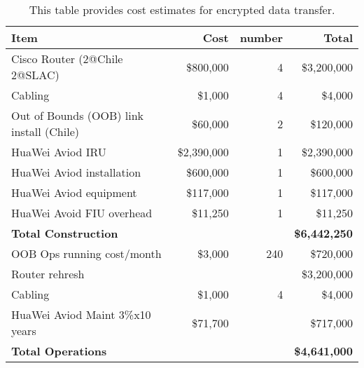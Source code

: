 \tiny \begin{longtable} {|l|r|r|r|} \caption{This table provides cost estimates for encrypted data transfer. \label{tab:ipsec}}\\ 
\hline 
\textbf{Item}&\textbf{Cost}&\textbf{number}&\textbf{Total} \\ \hline
{Cisco Router (2@Chile 2@SLAC)}&{\$800,000}&{4}&{\$3,200,000} \\ \hline
{Cabling}&{\$1,000}&{4}&{\$4,000} \\ \hline
{Out of Bounds (OOB) link  install (Chile)}&{\$60,000}&{2}&{\$120,000} \\ \hline
{HuaWei Aviod IRU}&{\$2,390,000}&{1}&{\$2,390,000} \\ \hline
{HuaWei Aviod installation}&{\$600,000}&{1}&{\$600,000} \\ \hline
{HuaWei Aviod equipment}&{\$117,000}&{1}&{\$117,000} \\ \hline
{HuaWei Avoid FIU overhead}&{\$11,250}&{1}&{\$11,250} \\ \hline
\textbf{Total Construction}&\textbf{}&\textbf{}&\textbf{\$6,442,250} \\ \hline
{OOB Ops running cost/month}&{\$3,000}&{240}&{\$720,000} \\ \hline
{Router rehresh}&{}&{ }&{\$3,200,000} \\ \hline
{Cabling}&{\$1,000}&{4}&{\$4,000} \\ \hline
{HuaWei Aviod Maint 3\%x10 years}&{\$71,700}&{\10}&{\$717,000} \\ \hline
\textbf{Total Operations}&\textbf{}&\textbf{}&\textbf{\$4,641,000} \\ \hline
\end{longtable} \normalsize
